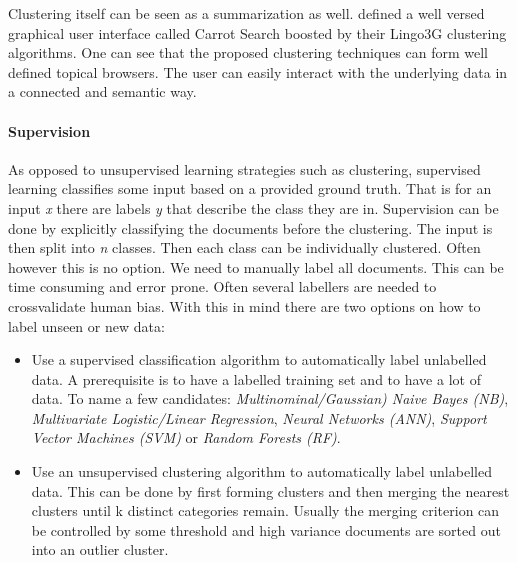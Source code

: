   Clustering itself can be seen as a summarization as well. \cite{Carrot2Search2003} defined a well versed graphical user interface called Carrot Search boosted by their Lingo3G clustering algorithms. One can see that the proposed clustering techniques can form well defined topical browsers. The user can easily interact with the underlying data in a connected and semantic way.

  \paragraph{Supervision}

    As opposed to unsupervised learning strategies such as clustering, supervised learning classifies some input based on a provided ground truth. That is for an input \emph{x} there are labels \emph{y} that describe the class they are in. Supervision can be done by explicitly classifying the documents before the clustering. The input is then split into \emph{n} classes. Then each class can be individually clustered. Often however this is no option. We need to manually label all documents. This can be time consuming and error prone. Often several labellers are needed to crossvalidate human bias.
    With this in mind there are two options on how to label unseen or new data:

      \begin{itemize}
        \item Use a supervised classification algorithm to automatically label unlabelled data. A prerequisite is to have a labelled training set and to have a lot of data. To name a few candidates: \emph{Multinominal/Gaussian) Naive Bayes (NB)}, \emph{Multivariate Logistic/Linear Regression}, \emph{Neural Networks (ANN)}, \emph{Support Vector Machines (SVM)} or \emph{Random Forests (RF)}. \cite{Nothing}
        \item Use an unsupervised clustering algorithm to automatically label unlabelled data. This can be done by first forming clusters and then merging the nearest clusters until k distinct categories remain. Usually the merging criterion can be controlled by some threshold and high variance documents are sorted out into an outlier cluster.
      \end{itemize}

